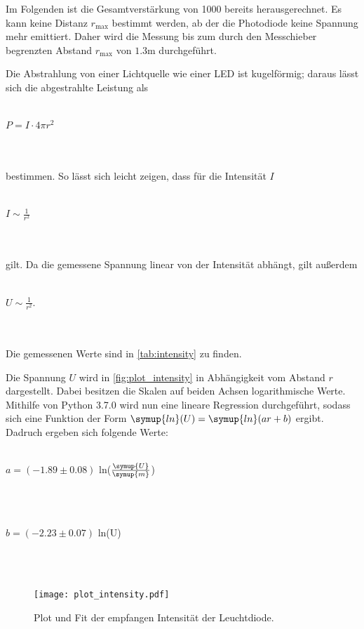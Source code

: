 Im Folgenden ist die Gesamtverstärkung von 1000 bereits herausgerechnet. Es kann keine Distanz $r_\text{max}$ bestimmt werden, ab der die Photodiode keine Spannung mehr emittiert. Daher wird die Messung bis zum durch den Messchieber begrenzten Abstand $r_\text{max}$ von $1.3$m durchgeführt.

Die Abstrahlung von einer Lichtquelle wie einer LED ist kugelförmig; daraus lässt sich die abgestrahlte Leistung als
\\ \\
\centerline{$P = I\cdot 4\pi r^2$}
\\ \\
bestimmen. So lässt sich leicht zeigen, dass für die Intensität $I$
\\ \\
\centerline{$I\sim \frac{1}{r^2}$}
\\ \\
gilt. Da die gemessene Spannung linear von der Intensität abhängt, gilt außerdem
\\ \\
\centerline{$U\sim \frac{1}{r^2}$.}
\\ \\


Die gemessenen Werte sind in \autoref{tab:intensity} zu finden.

Die Spannung $U$ wird in \autoref{fig:plot_intensity} in Abhängigkeit vom Abstand $r$ dargestellt. Dabei besitzen die Skalen auf beiden Achsen logarithmische Werte.
Mithilfe von Python 3.7.0 wird nun eine lineare Regression durchgeführt, sodass sich eine Funktion der Form $\symup{ln}(U) = \symup{ln}(ar + b)$ ergibt.
Dadruch ergeben sich folgende Werte:
\\ \\
\centerline{$a = (-1.89 \pm 0.08)$ ln($\frac{\symup{U}}{\symup{m}}$)}
\\ \\
\centerline{$b = (-2.23 \pm 0.07)$ ln(U)}
\\ \\ 
\begin{figure}
  \centering
  \texttt{[image: plot\_intensity.pdf]}
  \caption{Plot und Fit der empfangen Intensität der Leuchtdiode.}
  \label{fig:plot_intensity}
\end{figure}